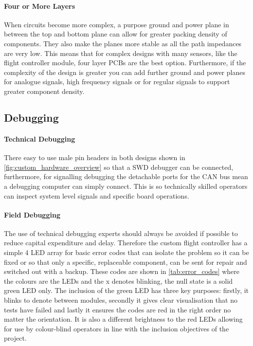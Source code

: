 \paragraph{Four or More Layers}
When circuits become more complex, a purpose ground and power plane in between the top and bottom plane can allow for greater packing density of components. They also make the planes more stable as all the path impedances are very low. This means that for complex designs with many sensors, like the flight controller module, four layer \gls{PCB}s are the best option. Furthermore, if the complexity of the design is greater you can add further ground and power planes for analogue signals, high frequency signals or for regular signals to support greater component density.

\subsection{Debugging}
\paragraph{Technical Debugging}
There easy to use male pin headers in both designs shown in \ref{fig:custom_hardware_overview} so that a \gls{SWD} debugger can be connected, furthermore, for signalling debugging the detachable ports for the \gls{CAN} bus mean a debugging computer can simply connect. This is so technically skilled operators can inspect system level signals and specific board operations.
\paragraph{Field Debugging}
The use of technical debugging experts should always be avoided if possible to reduce capital expenditure and delay. Therefore the custom flight controller has a simple 4 \gls{LED} array for basic error codes that can isolate the problem so it can be fixed or so that only a specific, replaceable component, can be sent for repair and switched out with a backup. These codes are shown in \ref{tab:error_codes} where the colours are the \gls{LED}s and the x denotes blinking, the null state is a solid green \gls{LED} only.  The inclusion of the green LED has three key purposes: firstly, it blinks to denote between modules, secondly it gives clear visualisation that no tests have failed and lastly it ensures the codes are red in the right order no matter the orientation. It is also a different brightness to the red \gls{LED}s allowing for use by colour-blind operators in line with the inclusion objectives of the project.

